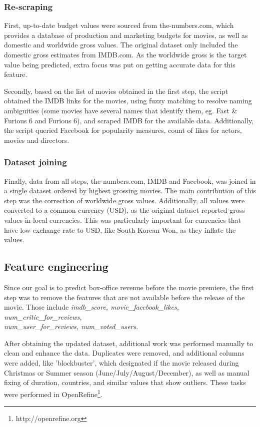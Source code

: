\subsubsection{Re-scraping}
First, up-to-date budget values were sourced from the-numbers.com, which provides a database of production and marketing budgets for movies, as well as domestic and worldwide gross values. The original dataset only included the domestic gross estimates from IMDB.com. As the worldwide gross is the target value  being predicted, extra focus was put on getting accurate data for this feature.

Secondly, based on the list of movies obtained in the first step, the script obtained the IMDB links for the movies, using fuzzy matching  to resolve naming ambiguities (some movies have several names that identify them, eg. Fast \& Furious 6 and Furious 6), and scraped IMDB for the available data. Additionally, the script queried Facebook for popularity measures, count of likes for actors, movies and directors.

\subsubsection{Dataset joining}
Finally, data from all steps, the-numbers.com, IMDB and Facebook, was joined in a single dataset ordered by highest grossing movies. The main contribution of this step was the correction of worldwide gross values. Additionally, all values were converted to a common currency (USD), as the original dataset reported gross values in local currencies. This was particularly important for currencies that have low exchange rate to USD, like South Korean Won, as they inflate the values.

\subsection{Feature engineering}
Since our goal is to predict box-office revenue before the movie premiere, the first step was to remove the features that are not available before the release of the movie. Those include \textit{imdb\_score, movie\_facebook\_likes, num\_critic\_for\_reviews, \\num\_user\_for\_reviews, num\_voted\_users}.

After obtaining the updated dataset, additional work was performed manually to clean and enhance the data. Duplicates were removed, and additional columns were added, like 'blockbuster', which designated if the movie released during Christmas or Summer season (June/July/August/December), as well as manual fixing of duration, countries, and similar values that show outliers. These tasks were performed in OpenRefine\footnote{http://openrefine.org}.

